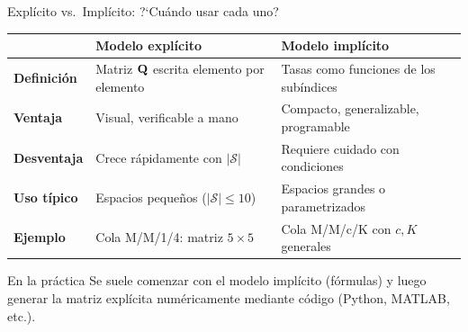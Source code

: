 \documentclass[aspectratio=1610, 9pt]{beamer}
\begin{document}
\begin{frame}{Expl\'icito vs.\ Impl\'icito: ?`Cu\'ando usar cada uno?}

\renewcommand{\arraystretch}{1.4}
\begin{tabular}{>{\bfseries}p{3cm} p{5.5cm} p{5.5cm}}
\toprule
& \textbf{Modelo expl\'icito} & \textbf{Modelo impl\'icito} \\
\midrule
Definici\'on & Matriz $\mathbf{Q}$ escrita elemento por elemento & Tasas como funciones de los sub\'indices \\
\midrule
Ventaja & Visual, verificable a mano & Compacto, generalizable, programable \\
\midrule
Desventaja & Crece r\'apidamente con $|\mathcal{S}|$ & Requiere cuidado con condiciones \\
\midrule
Uso t\'ipico & Espacios peque\~nos ($|\mathcal{S}| \le 10$) & Espacios grandes o parametrizados \\
\midrule
Ejemplo & Cola M/M/1/4: matriz $5\times 5$ & Cola M/M/c/K con $c,K$ generales \\
\bottomrule
\end{tabular}

\vspace{8pt}
\begin{block}{En la pr\'actica}
Se suele comenzar con el modelo impl\'icito (f\'ormulas) y luego generar la matriz expl\'icita num\'ericamente mediante c\'odigo (Python, MATLAB, etc.).
\end{block}
\end{frame}
\end{document}
